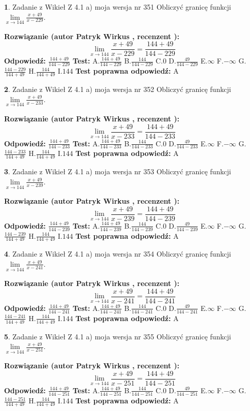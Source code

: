 \documentclass[12pt, a4paper]{article}
\theoremstyle{definition} %
\newtheorem{zad}{}
\newcommand{\zadStart}[1]{\begin{zad}#1\newline}
\newcommand{\zadStop}{\end{zad}}
\newcommand{\rozwStart}[2]{\noindent \textbf{Rozwiązanie (autor #1 , recenzent #2): }\newline}
\newcommand{\rozwStop}{\newline}
\newcommand{\odpStart}{\noindent \textbf{Odpowiedź:}\newline}
\newcommand{\odpStop}{\newline}
\newcommand{\testStart}{\noindent \textbf{Test:}\newline}
\newcommand{\testStop}{\newline}
\newcommand{\kluczStart}{\noindent \textbf{Test poprawna odpowiedź:}\newline}
\newcommand{\kluczStop}{\newline}
\begin{document}
\zadStart{Zadanie z Wikieł Z 4.1 a) moja wersja nr 351}
Obliczyć granicę funkcji $\lim\limits_{x\to144}\frac{x+49}{x-229}$.
\zadStop
\rozwStart{Patryk Wirkus}{}
$$\lim\limits_{x\to144}\frac{x+49}{x-229} = \frac{144+49}{144-229}$$
\rozwStop
\odpStart
$\frac{144+49}{144-229}$
\odpStop
\testStart
A.$\frac{144+49}{144-229}$
B.$\frac{144}{144-229}$
C.$0$
D.$\frac{49}{144-229}$
E.$\infty$
F.$-\infty$
G.$\frac{144-229}{144+49}$
H.$\frac{144}{144+49}$
I.$144$
\testStop
\kluczStart
A
\kluczStop



\zadStart{Zadanie z Wikieł Z 4.1 a) moja wersja nr 352}
Obliczyć granicę funkcji $\lim\limits_{x\to144}\frac{x+49}{x-233}$.
\zadStop
\rozwStart{Patryk Wirkus}{}
$$\lim\limits_{x\to144}\frac{x+49}{x-233} = \frac{144+49}{144-233}$$
\rozwStop
\odpStart
$\frac{144+49}{144-233}$
\odpStop
\testStart
A.$\frac{144+49}{144-233}$
B.$\frac{144}{144-233}$
C.$0$
D.$\frac{49}{144-233}$
E.$\infty$
F.$-\infty$
G.$\frac{144-233}{144+49}$
H.$\frac{144}{144+49}$
I.$144$
\testStop
\kluczStart
A
\kluczStop



\zadStart{Zadanie z Wikieł Z 4.1 a) moja wersja nr 353}
Obliczyć granicę funkcji $\lim\limits_{x\to144}\frac{x+49}{x-239}$.
\zadStop
\rozwStart{Patryk Wirkus}{}
$$\lim\limits_{x\to144}\frac{x+49}{x-239} = \frac{144+49}{144-239}$$
\rozwStop
\odpStart
$\frac{144+49}{144-239}$
\odpStop
\testStart
A.$\frac{144+49}{144-239}$
B.$\frac{144}{144-239}$
C.$0$
D.$\frac{49}{144-239}$
E.$\infty$
F.$-\infty$
G.$\frac{144-239}{144+49}$
H.$\frac{144}{144+49}$
I.$144$
\testStop
\kluczStart
A
\kluczStop



\zadStart{Zadanie z Wikieł Z 4.1 a) moja wersja nr 354}
Obliczyć granicę funkcji $\lim\limits_{x\to144}\frac{x+49}{x-241}$.
\zadStop
\rozwStart{Patryk Wirkus}{}
$$\lim\limits_{x\to144}\frac{x+49}{x-241} = \frac{144+49}{144-241}$$
\rozwStop
\odpStart
$\frac{144+49}{144-241}$
\odpStop
\testStart
A.$\frac{144+49}{144-241}$
B.$\frac{144}{144-241}$
C.$0$
D.$\frac{49}{144-241}$
E.$\infty$
F.$-\infty$
G.$\frac{144-241}{144+49}$
H.$\frac{144}{144+49}$
I.$144$
\testStop
\kluczStart
A
\kluczStop



\zadStart{Zadanie z Wikieł Z 4.1 a) moja wersja nr 355}
Obliczyć granicę funkcji $\lim\limits_{x\to144}\frac{x+49}{x-251}$.
\zadStop
\rozwStart{Patryk Wirkus}{}
$$\lim\limits_{x\to144}\frac{x+49}{x-251} = \frac{144+49}{144-251}$$
\rozwStop
\odpStart
$\frac{144+49}{144-251}$
\odpStop
\testStart
A.$\frac{144+49}{144-251}$
B.$\frac{144}{144-251}$
C.$0$
D.$\frac{49}{144-251}$
E.$\infty$
F.$-\infty$
G.$\frac{144-251}{144+49}$
H.$\frac{144}{144+49}$
I.$144$
\testStop
\kluczStart
A
\kluczStop
\end{document}
